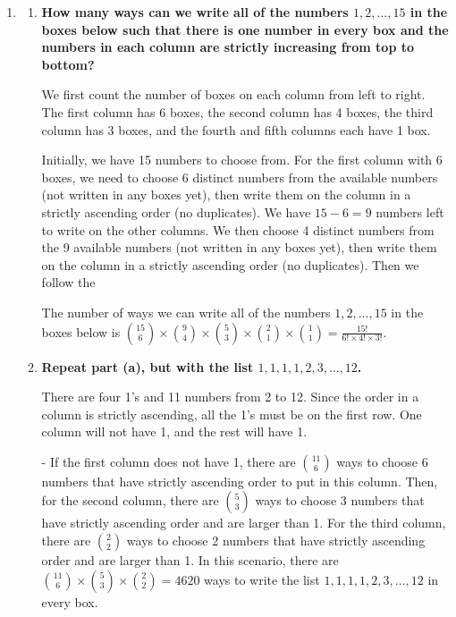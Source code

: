 \documentclass[10pt]{article}
\begin{document}
\begin{enumerate}
\begin{enumerate}
There are no lattice paths that go from $(0,0)$ to $(13,9)$ that can pass through both $(8,7)$ and $(11, 5)$ since we cannot go either down or left. 

Therefore, the number of lattice paths from $(0,0)$ to $(13, 9)$ that do not pass through either $(8, 7)$ or $(11, 5)$ is $497420 - 135135 - 65520 = 296765$.

\end{enumerate}

\vskip 1cm

\item
\begin{enumerate}
\item
\textbf{How many ways can we write all of the numbers $1,2,\ldots,15$ in the boxes below such that there is one number in every box and the numbers in each column are strictly increasing from top to bottom?}

We first count the number of boxes on each column from left to right. The first column has 6 boxes, the second column has 4 boxes, the third column has 3 boxes, and the fourth and fifth columns each have 1 box.

Initially, we have 15 numbers to choose from. For the first column with 6 boxes, we need to choose 6 distinct numbers from the available numbers (not written in any boxes yet), then write them on the column in a strictly ascending order (no duplicates). We have $15 - 6 = 9$ numbers left to write on the other columns. We then choose 4 distinct numbers from the 9 available numbers (not written in any boxes yet), then write them on the column in a strictly ascending order (no duplicates). Then we follow the 

The number of ways we can write all of the numbers $1,2,\ldots,15$ in the boxes below is $\binom{15}{6} \times \binom{9}{4} \times \binom{5}{3} \times \binom{2}{1} \times \binom{1}{1}=\frac{15!}{6! \times 4! \times 3!}$.

\item
\textbf{Repeat part (a), but with the list $1,1,1,1,2,3,\ldots,12$.}

There are four 1's and 11 numbers from 2 to 12. Since the order in a column is strictly ascending, all the 1's must be on the first row. One column will not have 1, and the rest will have 1.

- If the first column does not have 1, there are $\binom{11}{6}$ ways to choose 6 numbers that have strictly ascending order to put in this column. Then, for the second column, there are $\binom{5}{3}$ ways to choose 3 numbers that have strictly ascending order and are larger than 1. For the third column, there are $\binom{2}{2}$ ways to choose 2 numbers that have strictly ascending order and are larger than 1. In this scenario, there are $\binom{11}{6} \times \binom{5}{3} \times \binom{2}{2} = 4620$ ways to write the list $1,1,1,1,2,3,\ldots,12$ in every box.


\end{enumerate}
\end{enumerate}
\end{document}

